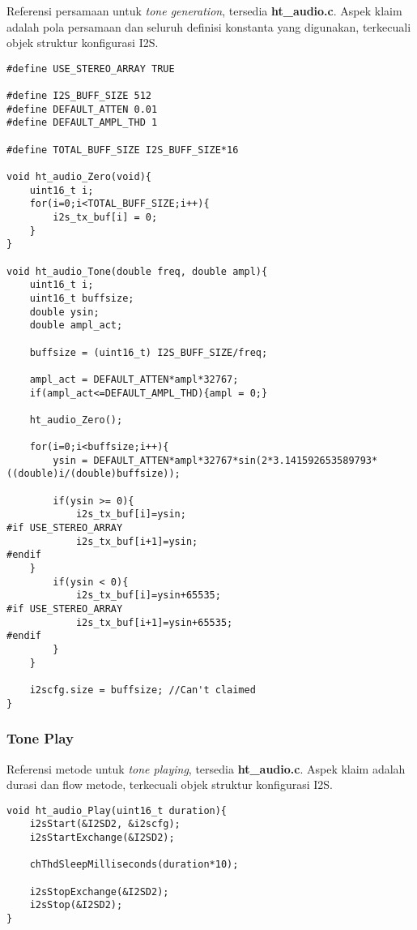 \documentclass[12pt,]{article}
\begin{document}
	Referensi persamaan untuk \textit{tone generation}, tersedia \textbf{ht\_audio.c}.
	Aspek klaim adalah pola persamaan dan seluruh definisi konstanta yang digunakan,
	terkecuali objek struktur konfigurasi I2S.
	
\begin{verbatim}
#define USE_STEREO_ARRAY TRUE

#define I2S_BUFF_SIZE 512
#define DEFAULT_ATTEN 0.01
#define DEFAULT_AMPL_THD 1

#define TOTAL_BUFF_SIZE I2S_BUFF_SIZE*16

void ht_audio_Zero(void){
	uint16_t i;
	for(i=0;i<TOTAL_BUFF_SIZE;i++){
		i2s_tx_buf[i] = 0;
	}
}

void ht_audio_Tone(double freq, double ampl){
	uint16_t i;
	uint16_t buffsize;
	double ysin;
	double ampl_act;
	
	buffsize = (uint16_t) I2S_BUFF_SIZE/freq;
	
	ampl_act = DEFAULT_ATTEN*ampl*32767;
	if(ampl_act<=DEFAULT_AMPL_THD){ampl = 0;}
	
	ht_audio_Zero();
	
	for(i=0;i<buffsize;i++){
		ysin = DEFAULT_ATTEN*ampl*32767*sin(2*3.141592653589793*((double)i/(double)buffsize));
	
		if(ysin >= 0){
			i2s_tx_buf[i]=ysin;
#if USE_STEREO_ARRAY
			i2s_tx_buf[i+1]=ysin;
#endif
	}
		if(ysin < 0){
			i2s_tx_buf[i]=ysin+65535;
#if USE_STEREO_ARRAY
			i2s_tx_buf[i+1]=ysin+65535;
#endif
		}
	}
	
	i2scfg.size = buffsize; //Can't claimed
}
\end{verbatim}

	\subsubsection{Tone Play}
	
	Referensi metode untuk \textit{tone playing}, tersedia \textbf{ht\_audio.c}.
	Aspek klaim adalah durasi dan flow metode, terkecuali objek struktur konfigurasi I2S.

\begin{verbatim}
void ht_audio_Play(uint16_t duration){
	i2sStart(&I2SD2, &i2scfg);
	i2sStartExchange(&I2SD2);
	
	chThdSleepMilliseconds(duration*10);
	
	i2sStopExchange(&I2SD2);
	i2sStop(&I2SD2);
}
\end{verbatim}
\end{document}

